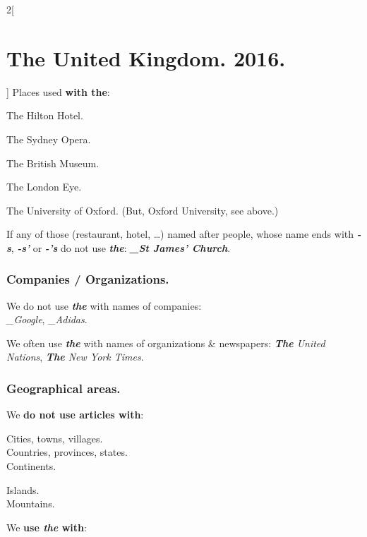 \documentclass[10pt,a4paper]{article}
\newlength{\OriginalParIndent}
\newcommand\ex[1]{\textit{\textbf{{#1}}}}           %
\newcommand\za{\_\thinspace }                       %
\begin{document}
\begin{multicols}{2}[\section{The United Kingdom. 2016.}]
\vspace{2mm}
Places used \textbf{with the}:
\begin{description}[leftmargin=3.9cm,rightmargin=\OriginalParIndent,style=nextline,before={\renewcommand\makelabel[1]{##1:}}]
  \item[Hotels] The Hilton Hotel.
  \item[Theaters, cinemas, operas] The Sydney Opera.
  \item[Museums] The British Museum.
  \item[Monuments, towers] The London Eye.
  \item[Names with ``of''] The University of Oxford. (But, Oxford University, see above.)
\end{description}
\vspace{-\parskip}
If any of those (restaurant, hotel, \dots) named after people, whose name ends with \ex{-s}, \ex{-s’} or \ex{-’s}
do not use \ex{the}: \ex{\za St James’ Church}.



\subsubsection{Companies / Organizations.}
We do not use \ex{the} with names of companies:\\
\textit{\za Google}, \textit{\za Adidas}.

We often use \ex{the} with names of organizations \& newspapers:
\textit{\ex{The} United Nations}, \textit{\ex{The} New York Times}.



\subsubsection{Geographical areas.}
We \textbf{do not use articles with}:

\hspace{\OriginalParIndent}\begin{minipage}{0.55\linewidth}
Cities, towns, villages.\\
Countries, provinces, states.\\
Continents.
\end{minipage}
\begin{minipage}{0.3\linewidth}
Islands.\\
Mountains.
\end{minipage}\vspace{\parskip}


We \textbf{use \ex{the} with}:


\end{multicols}
\end{document}
